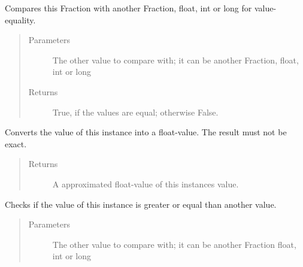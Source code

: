 \documentclass[letterpaper,10pt,english]{sphinxmanual}
\begin{document}
\begin{fulllineitems}
\begin{fulllineitems}
\label{\detokenize{fraction:fraction.Fraction.__eq__}}
Compares this Fraction with another Fraction, float, int or long for value-equality.
\begin{quote}\begin{description}
\item[{Parameters}] \leavevmode
{} \textendash{} The other value to compare with; it can be another Fraction, float, int or long

\item[{Returns}] \leavevmode
True, if the values are equal; otherwise False.

\end{description}\end{quote}

\end{fulllineitems}


\begin{fulllineitems}
\label{\detokenize{fraction:fraction.Fraction.__float__}}
Converts the value of this instance into a float-value. The result must not be exact.
\begin{quote}\begin{description}
\item[{Returns}] \leavevmode
A approximated float-value of this instances value.

\end{description}\end{quote}

\end{fulllineitems}


\begin{fulllineitems}
\label{\detokenize{fraction:fraction.Fraction.__ge__}}
Checks if the value of this instance is greater or equal than another value.
\begin{quote}\begin{description}
\item[{Parameters}] \leavevmode
{} \textendash{} The other value to compare with; it can be another Fraction float, int or long


\end{description}
\end{quote}
\end{fulllineitems}
\end{fulllineitems}
\end{document}
